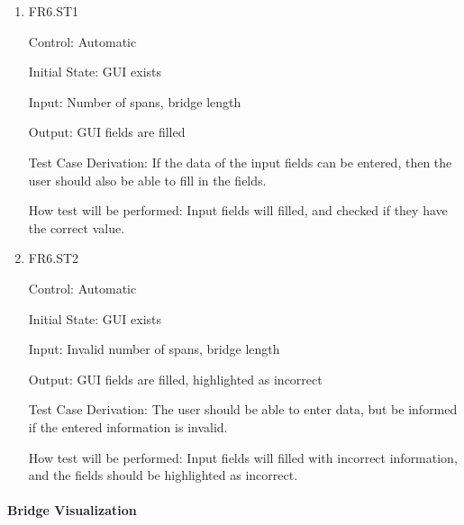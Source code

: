 \documentclass[12pt, titlepage]{article}
\begin{document}
\begin{enumerate}

  \item{FR6.ST1\\}

  Control: Automatic
  
  Initial State: GUI exists
  
  Input: Number of spans, bridge length
  
  Output: GUI fields are filled
  
  Test Case Derivation: If the data of the input fields can be entered, then the user
  should also be able to fill in the fields.
  
  How test will be performed: Input fields will filled, and checked if they have the
  correct value.
  
  \item{FR6.ST2\\}
  
  Control: Automatic
  
  Initial State: GUI exists
  
  Input: Invalid number of spans, bridge length
  
  Output: GUI fields are filled, highlighted as incorrect
  
  Test Case Derivation: The user should be able to enter data, but be informed if the
  entered information is invalid.
  
  How test will be performed: Input fields will filled with incorrect information, 
  and the fields should be highlighted as incorrect.

\end{enumerate}

\paragraph{Bridge Visualization}
\end{document}
